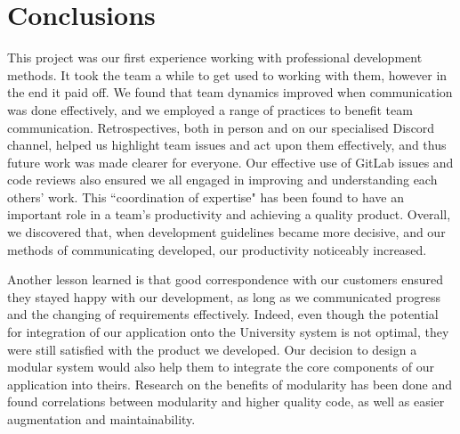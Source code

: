 \documentclass{l3proj}
\begin{document}
\section{Conclusions}
\label{sec:conclusion}


This project was our first experience working with professional development methods. It took the team a while to get used to working with them, however in the end it paid off. We found that team dynamics improved when communication was done effectively, and we employed a range of practices to benefit team communication. Retrospectives, both in person and on our specialised Discord channel, helped us highlight team issues and act upon them effectively, and thus future work was made clearer for everyone. Our effective use of GitLab issues and code reviews also ensured we all engaged in improving and understanding each others' work. This ``coordination of expertise" has been found to have an important role in a team's productivity and achieving a quality product\cite{teamwork:Weimar}. Overall, we discovered that, when development guidelines became more decisive, and our methods of communicating developed, our productivity noticeably increased.

Another lesson learned is that good correspondence with our customers ensured they stayed happy with our development, as long as we communicated progress and the changing of requirements effectively. Indeed, even though the potential for integration of our application onto the University system is not optimal, they were still satisfied with the product we developed. Our decision to design a modular system would also help them to integrate the core components of our application into theirs. Research on the benefits of modularity has been done and found correlations between modularity and higher quality code, as well as easier augmentation and maintainability\cite{modularity:Woude, modularity:MacCormarck}.
\end{document}
